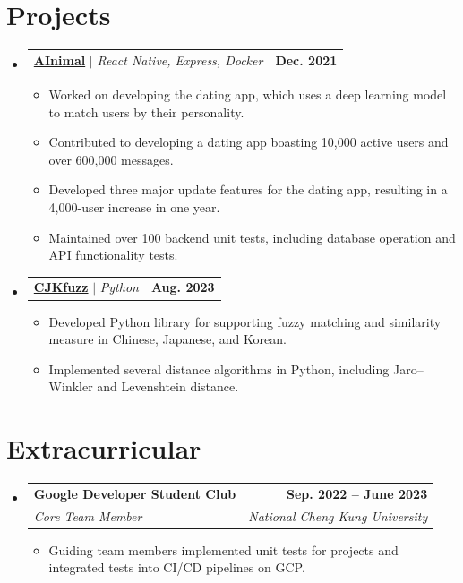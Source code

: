 \documentclass[letterpaper,11pt]{article}
\makeatletter
\newcommand{\resumeItem}[1]{
  \item\small{
    {#1 \vspace{-2pt}}
  }
}
\newcommand{\resumeSubheading}[4]{
  \vspace{-2pt}\item
    \begin{tabular*}{1.0\textwidth}[t]{l@{\extracolsep{\fill}}r}
      \textbf{#1} & \textbf{\small #2} \\
      \textit{\small#3} & \textit{\small #4} \\
    \end{tabular*}\vspace{-7pt}
}
\newcommand{\resumeProjectHeading}[2]{
    \item
    \begin{tabular*}{1.001\textwidth}{l@{\extracolsep{\fill}}r}
      \small#1 & \textbf{\small #2}\\
    \end{tabular*}\vspace{-7pt}
}
\newcommand{\resumeSubHeadingListStart}{\begin{itemize}[leftmargin=0.0in, label={}]}
\newcommand{\resumeSubHeadingListEnd}{\end{itemize}}
\newcommand{\resumeItemListStart}{\begin{itemize}}
\newcommand{\resumeItemListEnd}{\end{itemize}\vspace{-5pt}}
\makeatother
\begin{document}
\section{Projects}
    \vspace{-5pt}
    \resumeSubHeadingListStart
      \resumeProjectHeading
          {\href{https://official.ainimal.io/}{\textbf{AInimal}} $|$ \emph{React Native, Express, Docker}}{Dec. 2021}
          \resumeItemListStart
            \resumeItem{Worked on developing the dating app, which uses a deep learning model to match users by their personality.}
            \resumeItem{Contributed to developing a dating app boasting 10,000 active users and over 600,000 messages.}
            \resumeItem{Developed three major update features for the dating app, resulting in a 4,000-user increase in one year.}
            \resumeItem{Maintained over 100 backend unit tests, including database operation and API functionality tests.}
          \resumeItemListEnd
          \vspace{-13pt}
      \resumeProjectHeading
          {\href{https://github.com/eddielin0926/cjkfuzz}{\textbf{CJKfuzz}} $|$ \emph{Python}}{Aug. 2023}
          \resumeItemListStart
            \resumeItem{Developed Python library for supporting fuzzy matching and similarity measure in Chinese, Japanese, and Korean.}
            \resumeItem{Implemented several distance algorithms in Python, including Jaro–Winkler and Levenshtein distance.}
          \resumeItemListEnd 
    \resumeSubHeadingListEnd
\vspace{-15pt}

\section{Extracurricular}
    \resumeSubHeadingListStart
        \resumeSubheading{Google Developer Student Club}{Sep. 2022 -- June 2023}{Core Team Member}{National Cheng Kung University}
            \resumeItemListStart
                \resumeItem{Guiding team members implemented unit tests for projects and integrated tests into CI/CD pipelines on GCP.}
            \resumeItemListEnd
        
    \resumeSubHeadingListEnd
\vspace{-15pt}

\end{document}
